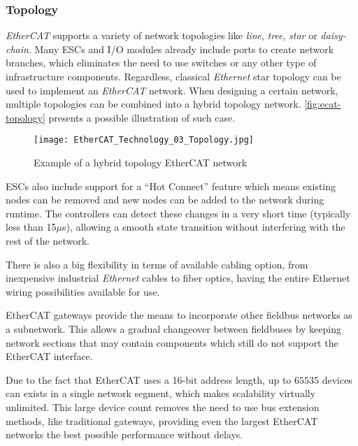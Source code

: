 \subsubsection{Topology}

\emph{EtherCAT} supports a variety of network topologies like \emph{line}, \emph{tree}, \emph{star} or \emph{daisy-chain}.
Many ESCs and I/O modules already include ports to create network branches, which eliminates the need to use switches or any other type of infrastructure components.
Regardless, classical \emph{Ethernet} star topology can be used to implement an \emph{EtherCAT} network.
When designing a certain network, multiple topologies can be combined into a hybrid topology network.
\autoref{fig:ecat-topology} presents a possible illustration of such case.

\begin{figure}[htp]
	\centering
	\texttt{[image: EtherCAT\_Technology\_03\_Topology.jpg]}
	\caption{Example of a hybrid topology EtherCAT network \cite{protocol:ethercat}}
	\label{fig:ecat-topology}
\end{figure}

ESCs also include support for a ``Hot Connect'' feature which means existing nodes can be removed and new nodes can be added to the network during runtime.
The controllers can detect these changes in a very short time (typically less than 15$\mu$s), allowing a smooth state transition without interfering with the rest of the network.

There is also a big flexibility in terms of available cabling option, from inexpensive industrial \emph{Ethernet} cables to fiber optics, having the entire Ethernet wiring possibilities available for use.

EtherCAT gateways provide the means to incorporate other fieldbus networks as a subnetwork.
This allows a gradual changeover between fieldbuses by keeping network sections that may contain components which still do not support the EtherCAT interface.

Due to the fact that EtherCAT uses a 16-bit address length, up to $65535$ devices can exists in a single network segment, which makes scalability virtually unlimited.
This large device count removes the need to use bus extension methods, like traditional gateways, providing even the largest EtherCAT networks the best possible performance without delays.
